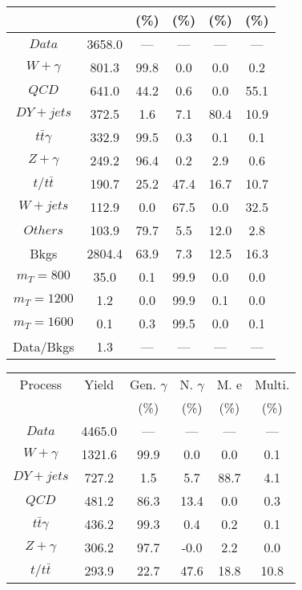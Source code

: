 \begin{figure}
\begin{minipage}[c]{0.32\textwidth}
{\begin{tabular}{cccccc}
 &  & (\%) & (\%) & (\%) & (\%)  \\
\hline
                                                                      $ Data $ &  3658.0 &  --- &  --- &  --- &  ---\\
$ W+\gamma $ &  801.3 &  99.8 &  0.0 &  0.0 &  0.2\\
$ QCD $ &  641.0 &  44.2 &  0.6 &  0.0 &  55.1\\
$ DY+jets $ &  372.5 &  1.6 &  7.1 &  80.4 &  10.9\\
$ t\bar{t}\gamma $ &  332.9 &  99.5 &  0.3 &  0.1 &  0.1\\
$ Z+\gamma $ &  249.2 &  96.4 &  0.2 &  2.9 &  0.6\\
$ t/t\bar{t} $ &  190.7 &  25.2 &  47.4 &  16.7 &  10.7\\
$ W+jets $ &  112.9 &  0.0 &  67.5 &  0.0 &  32.5\\
$ Others $ &  103.9 &  79.7 &  5.5 &  12.0 &  2.8\\
Bkgs &  2804.4 &  63.9 &  7.3 &  12.5 &  16.3\\
$ m_{T} = 800 $ &  35.0 &  0.1 &  99.9 &  0.0 &  0.0\\
$ m_{T} = 1200 $ &  1.2 &  0.0 &  99.9 &  0.1 &  0.0\\
$ m_{T} = 1600 $ &  0.1 &  0.3 &  99.5 &  0.0 &  0.1\\
Data/Bkgs &  1.3 &  --- &  --- &  --- &  ---\\
\hline
\end{tabular}
}
\end{minipage}
\begin{minipage}[c]{0.32\textwidth}
\centering
\tiny{
\begin{tabular}{cccccc}
\hline
Process & Yield & Gen. $\gamma$ & N. $\gamma$ & M. e & Multi. \\
 &  & (\%) & (\%) & (\%) & (\%)  \\
\hline
                                                                      $ Data $ &  4465.0 &  --- &  --- &  --- &  ---\\
$ W+\gamma $ &  1321.6 &  99.9 &  0.0 &  0.0 &  0.1\\
$ DY+jets $ &  727.2 &  1.5 &  5.7 &  88.7 &  4.1\\
$ QCD $ &  481.2 &  86.3 &  13.4 &  0.0 &  0.3\\
$ t\bar{t}\gamma $ &  436.2 &  99.3 &  0.4 &  0.2 &  0.1\\
$ Z+\gamma $ &  306.2 &  97.7 &  -0.0 &  2.2 &  0.0\\
$ t/t\bar{t} $ &  293.9 &  22.7 &  47.6 &  18.8 &  10.8\\

\end{tabular}}
\end{minipage}
\end{figure}
